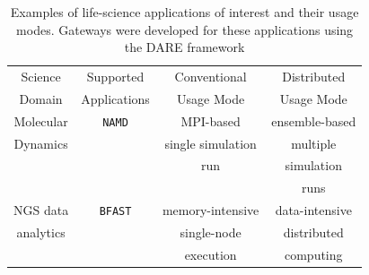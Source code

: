 \documentclass[]{svjour3}
\begin{document}
\begin{table}
\centering
 \small
\begin{tabular}{|c|c|c|c|} 
  \hline Science  & Supported  & Conventional   &   Distributed
  \\
  Domain & Applications & Usage Mode & Usage Mode\\ \hline \hline 
  
  Molecular   &  \texttt{NAMD} &  MPI-based  & ensemble-based   \\
  Dynamics  &  & single simulation  & multiple  \\ 
  &  & run &  simulation  \\ 
  &  &  &  runs \\ \hline
    NGS data     &  \texttt{BFAST} & memory-intensive  & data-intensive\\ 
  analytics  &  &  single-node   &  distributed  \\
  & & execution  & computing \\ \hline
    \hline
\end{tabular} \caption{Examples of life-science applications of
  interest and their usage modes.  Gateways were developed for these
  applications using the DARE framework }
 \label{table:four-applications} 
\end{table}

\end{document}
